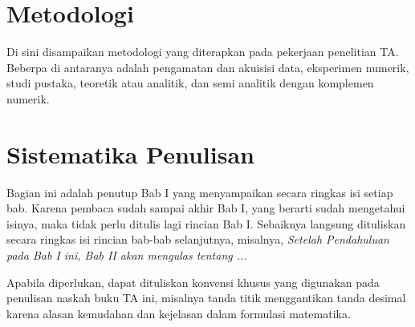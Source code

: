 \section{Metodologi}
Di sini disampaikan metodologi yang diterapkan pada pekerjaan penelitian TA. Beberpa di antaranya adalah pengamatan dan akuisisi data, eksperimen numerik, studi pustaka, teoretik atau analitik, dan semi analitik dengan komplemen numerik.



\section{Sistematika Penulisan}
\noindent Bagian ini adalah penutup Bab I yang menyampaikan  secara ringkas isi setiap  bab. Karena pembaca sudah sampai akhir Bab I, yang  berarti  sudah  mengetahui isinya, maka tidak perlu ditulis lagi rincian Bab I. Sebaiknya langsung dituliskan secara ringkas isi rincian bab-bab selanjutnya, misalnya, \textit{Setelah Pendahuluan pada Bab I ini, Bab II akan mengulas tentang ...}

Apabila diperlukan, dapat dituliskan konvensi khusus yang digunakan pada penulisan naskah buku TA ini, misalnya tanda titik menggantikan tanda desimal karena alasan kemudahan dan kejelasan dalam formulasi matematika.